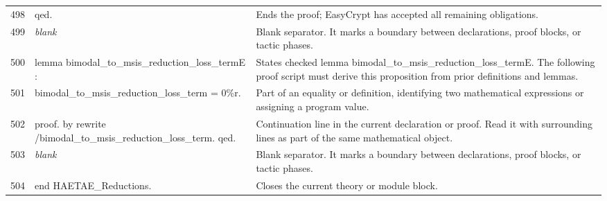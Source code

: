 \documentclass[10pt]{article}
\begin{document}
\begin{longtable}{r L{0.53\textwidth} L{0.37\textwidth}}
498 & {\ttfamily\scriptsize qed.} & Ends the proof; EasyCrypt has accepted all remaining obligations. \\
499 & {\ttfamily\scriptsize \emph{blank}} & Blank separator.  It marks a boundary between declarations, proof blocks, or tactic phases. \\
500 & {\ttfamily\scriptsize lemma bimodal\_to\_msis\_reduction\_loss\_termE :} & States checked lemma bimodal\_to\_msis\_reduction\_loss\_termE.  The following proof script must derive this proposition from prior definitions and lemmas. \\
501 & {\ttfamily\scriptsize   bimodal\_to\_msis\_reduction\_loss\_term = 0\%r.} & Part of an equality or definition, identifying two mathematical expressions or assigning a program value. \\
502 & {\ttfamily\scriptsize proof. by rewrite /bimodal\_to\_msis\_reduction\_loss\_term. qed.} & Continuation line in the current declaration or proof.  Read it with surrounding lines as part of the same mathematical object. \\
503 & {\ttfamily\scriptsize \emph{blank}} & Blank separator.  It marks a boundary between declarations, proof blocks, or tactic phases. \\
504 & {\ttfamily\scriptsize end HAETAE\_Reductions.} & Closes the current theory or module block. \\
\bottomrule
\end{longtable}
\end{document}

